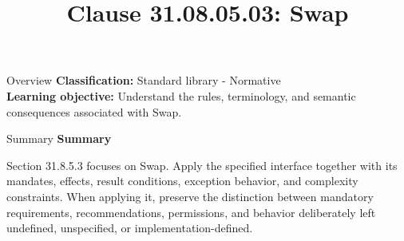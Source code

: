 \documentclass[10pt,letterpaper]{article}
\title{Clause 31.08.05.03: Swap}
\author{}
\date{}
\begin{document}
\maketitle
\begin{CornellOverviewBox}{Overview}
\textbf{Classification:} Standard library - Normative\\[2pt]
\textbf{Learning objective:} Understand the rules, terminology, and semantic consequences associated with Swap.
\end{CornellOverviewBox}\begin{CornellSummaryBox}{Summary}
{\sffamily\bfseries\color{Accent} Summary}\par\vspace{3pt}Section 31.8.5.3 focuses on Swap. Apply the specified interface together with its mandates, effects, result conditions, exception behavior, and complexity constraints. When applying it, preserve the distinction between mandatory requirements, recommendations, permissions, and behavior deliberately left undefined, unspecified, or implementation-defined.
\end{CornellSummaryBox}
\end{document}

